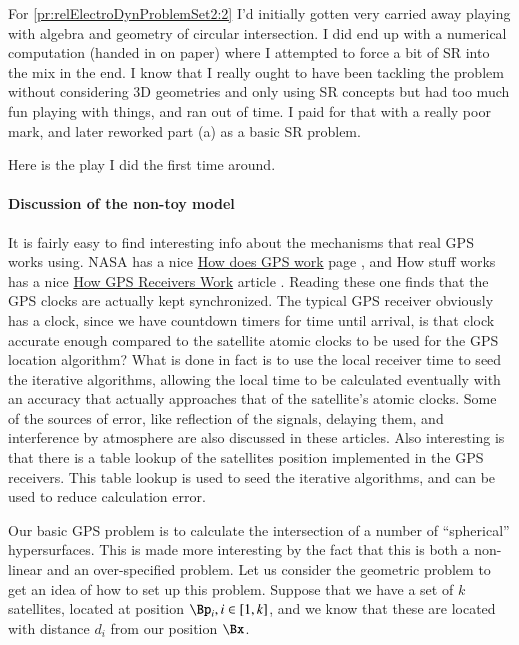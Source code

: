 %
%

For \cref{pr:relElectroDynProblemSet2:2} I'd initially gotten very carried away playing with algebra and geometry of circular intersection.
I did end up with a numerical computation (handed in on paper) where I attempted to force a bit of SR into the mix in the end.
I know that I really ought to have been tackling the problem without considering 3D geometries and only using SR concepts but had too much fun playing with things, and ran out of time.
I paid for that with a really poor mark, and later reworked part (a) as a basic SR problem.

Here is the play I did the first time around.

\paragraph{Discussion of the non-toy model}

It is fairly easy to find interesting info about the mechanisms that real GPS works using.  NASA has a nice \href{http://www.nasm.si.edu/gps/work.html}{How does GPS work} page \citep{nasaGPS}, and How stuff works has a nice \href{http://electronics.howstuffworks.com/gadgets/travel/gps.htm}{How GPS Receivers Work} article \citep{howStuffWorksGPS}.  Reading these one finds that the GPS clocks are actually kept synchronized.  The typical GPS receiver obviously has a clock, since we have countdown timers for time until arrival, is that clock accurate enough compared to the satellite atomic clocks to be used for the GPS location algorithm?  What is done in fact is to use the local receiver time to seed the iterative algorithms, allowing the local time to be calculated eventually with an accuracy that actually approaches that of the satellite's atomic clocks.  Some of the sources of error, like reflection of the signals, delaying them, and interference by atmosphere are also discussed in these articles.  Also interesting is that there is a table lookup of the satellites position implemented in the GPS receivers.  This table lookup is used to seed the iterative algorithms, and can be used to reduce calculation error.

Our basic GPS problem is to calculate the intersection of a number of ``spherical'' hypersurfaces.  This is made more interesting by the fact that this is both a non-linear and an over-specified problem.  Let us consider the geometric problem to get an idea of how to set up this problem.  Suppose that we have a set of \(k\) satellites, located at position \(\Bp_i, i \in [1,k]\), and we know that these are located with distance \(d_i\) from our position \(\Bx\).

